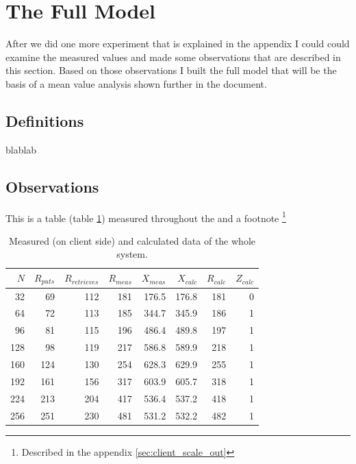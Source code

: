 
\section{The Full Model}
After we did one more experiment that is explained in the appendix
 I could could examine the measured values and made some observations that are
  described in this section. Based on those observations I built the full model
   that will be the basis of a mean value analysis shown further in the document.

\subsection{Definitions}
blablab

\subsection{Observations}
This is a table (table \ref{table:measuredData}) measured throughout the
 and a footnote \footnote{Described in the appendix \ref{sec:client_scale_out}} 
 
\begin{table}[h!]
 \centering
 \begin{tabular}{| r| rrrr | rr | r |}
    \hline \textbf{$N$} & \textbf{$R_{puts}$} & \textbf{$R_{retrieves}$} & \textbf{$R_{meas}$} & \textbf{$X_{meas}$} & \textbf{$X_{calc}$} & \textbf{$R_{calc}$}  & \textbf{$Z_{calc}$} \\
    \hline 32  & 69  & 112 & 181 & 176.5 & 176.8 & 181 & 0 \\
    \hline 64  & 72  & 113 & 185 & 344.7 & 345.9 & 186 & 1 \\
    \hline 96  & 81  & 115 & 196 & 486.4 & 489.8 & 197 & 1 \\
    \hline 128 & 98  & 119 & 217 & 586.8 & 589.9 & 218 & 1 \\
    \hline 160 & 124 & 130 & 254 & 628.3 & 629.9 & 255 & 1 \\
    \hline 192 & 161 & 156 & 317 & 603.9 & 605.7 & 318 & 1 \\
    \hline 224 & 213 & 204 & 417 & 536.4 & 537.2 & 418 & 1 \\
    \hline 256 & 251 & 230 & 481 & 531.2 & 532.2 & 482 & 1 \\ 
    \hline
 \end{tabular}
\caption{Measured (on client side) and calculated data of the whole system.}
\label{table:measuredData}
\end{table}


